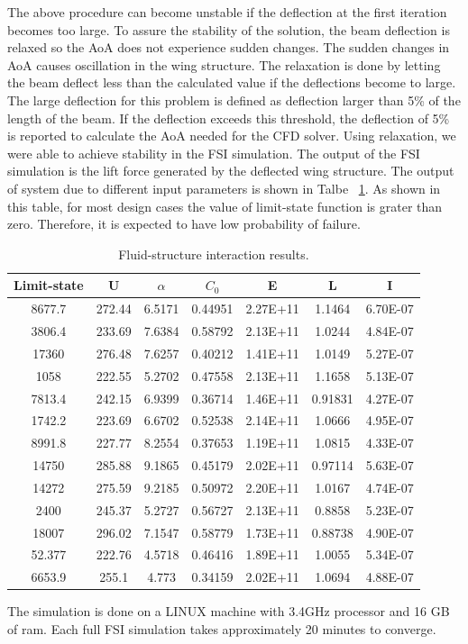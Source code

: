 \documentclass[paper=a4, fontsize=12pt]{scrartcl} %
\begin{document}
%
The above procedure can become unstable if the deflection at the first iteration becomes too large. To assure the stability of the solution, the beam deflection is relaxed so the AoA does not experience sudden changes. The sudden changes in AoA causes oscillation in the wing structure. The relaxation is done by letting the beam deflect less than the calculated value if the deflections become to large. The large deflection for this problem is defined as deflection larger than 5\% of the length of the beam. If the deflection exceeds this threshold, the deflection of 5\% is reported to calculate the AoA needed for the CFD solver. Using relaxation, we were able to achieve stability in the FSI simulation. The output of the FSI simulation is the lift force generated by the deflected wing structure. The output of system due to different input parameters is shown in Talbe ~\ref{table:resultsFSI}. As shown in this table, for most design cases the value of limit-state function is grater than zero. Therefore, it is expected to have low probability of failure.\\
%
\begin{table}[H]
\centering
\begin{tabular}{ c || c | c | c | c | c | c }
	Limit-state & U & $\alpha$ & $C_0$ & E & L & I \\
	\hline                       
	\hline
		8677.7 & 272.44 & 6.5171 & 0.44951 & 2.27E+11 & 1.1464 & 6.70E-07 \\
		3806.4 & 233.69 & 7.6384 & 0.58792 & 2.13E+11 & 1.0244 & 4.84E-07 \\
		17360 & 276.48 & 7.6257 & 0.40212 & 1.41E+11 & 1.0149 & 5.27E-07 \\
		1058 & 222.55 & 5.2702 & 0.47558 & 2.13E+11 & 1.1658 & 5.13E-07 \\
		7813.4 & 242.15 & 6.9399 & 0.36714 & 1.46E+11 & 0.91831 & 4.27E-07 \\
		1742.2 & 223.69 & 6.6702 & 0.52538 & 2.14E+11 & 1.0666 & 4.95E-07 \\
		8991.8 & 227.77 & 8.2554 & 0.37653 & 1.19E+11 & 1.0815 & 4.33E-07 \\
		14750 & 285.88 & 9.1865 & 0.45179 & 2.02E+11 & 0.97114 & 5.63E-07 \\
		14272 & 275.59 & 9.2185 & 0.50972 & 2.20E+11 & 1.0167 & 4.74E-07 \\
		2400 & 245.37 & 5.2727 & 0.56727 & 2.13E+11 & 0.8858 & 5.23E-07 \\
		18007 & 296.02 & 7.1547 & 0.58779 & 1.73E+11 & 0.88738 & 4.90E-07 \\
		52.377 & 222.76 & 4.5718 & 0.46416 & 1.89E+11 & 1.0055 & 5.34E-07 \\
		6653.9 & 255.1 & 4.773 & 0.34159 & 2.02E+11 & 1.0694 & 4.88E-07 \\
	\hline  
\end{tabular}
\caption{Fluid-structure interaction results.}
\label{table:resultsFSI}
\end{table}
%
The simulation is done on a LINUX machine with 3.4GHz processor and 16 GB of ram. Each full FSI simulation takes approximately 20 minutes to converge.
\end{document}
